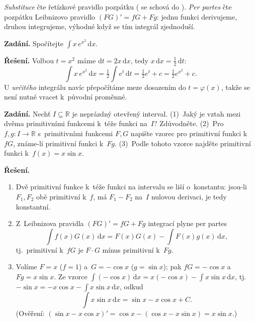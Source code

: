 \documentclass[11pt,a4paper]{article}
\begin{document}
\begin{intuice}
\emph{Substituce} čte řetízkové pravidlo pozpátku ( se schová do ). \emph{Per partes} čte pozpátku Leibnizovo pravidlo $(FG)'=fG+Fg$: jednu funkci derivujeme, druhou integrujeme, výhodné když se tím integrál zjednoduší.
\end{intuice}

\begin{priklad}[Substituce]
\textbf{Zadání.} Spočítejte $\int x\,e^{x^2}\,\mathrm{d}x$.\par
\textbf{Řešení.} Volbou $t=x^2$ máme $\mathrm{d}t=2x\,\mathrm{d}x$, tedy $x\,\mathrm{d}x=\tfrac12\,\mathrm{d}t$:
\[
  \int x\,e^{x^2}\,\mathrm{d}x=\tfrac12\int e^{t}\,\mathrm{d}t=\tfrac12 e^{t}+c=\tfrac12 e^{x^2}+c.
\]
U \emph{určitého} integrálu navíc přepočítáme meze dosazením do $t=\varphi(x)$, takže se není nutné vracet k~původní proměnné.
\end{priklad}

\begin{priklad} \par
\textbf{Zadání.} Nechť $I\subseteq\mathbb{R}$ je neprázdný otevřený interval. (1)~Jaký je vztah mezi dvěma primitivními funkcemi k~téže funkci na~$I$? Zdůvodněte. (2)~Pro $f,g\colon I\to\mathbb{R}$ s~primitivními funkcemi $F,G$ napište vzorec pro primitivní funkci k~$fG$, známe-li primitivní funkci k~$Fg$. (3)~Podle tohoto vzorce najděte primitivní funkci k~$f(x)=x\sin x$.\par
\textbf{Řešení.}
\begin{enumerate}
  \item Dvě primitivní funkce k~téže funkci na intervalu se liší o~konstantu: jsou-li $F_1,F_2$ obě primitivní k~$f$, má $F_1-F_2$ na~$I$ nulovou derivaci, je tedy konstantní.
  \item Z~Leibnizova pravidla $(FG)'=fG+Fg$ integrací plyne per partes
    \[
      \int f(x)G(x)\,\mathrm{d}x=F(x)G(x)-\int F(x)g(x)\,\mathrm{d}x,
    \]
    tj.\ primitivní k~$fG$ je $F\cdot G$ mínus primitivní k~$Fg$.
  \item Volíme $F=x$ ($f=1$) a~$G=-\cos x$ ($g=\sin x$); pak $fG=-\cos x$ a~$Fg=x\sin x$. Ze vzorce $\int(-\cos x)\,\mathrm{d}x=x(-\cos x)-\int x\sin x\,\mathrm{d}x$, tj.\ $-\sin x=-x\cos x-\int x\sin x\,\mathrm{d}x$, odkud
    \[
      \int x\sin x\,\mathrm{d}x=\sin x-x\cos x+C.
    \]
    (Ověření: $(\sin x-x\cos x)'=\cos x-(\cos x-x\sin x)=x\sin x$.)
\end{enumerate}
\end{priklad}
\end{document}
